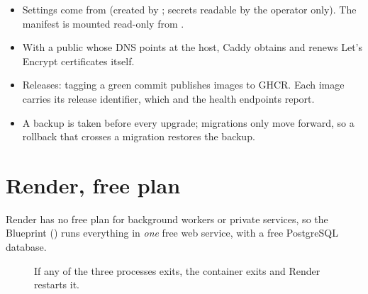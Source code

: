 \begin{itemize}
  \item Settings come from  (created by ; secrets readable by the operator only). The manifest is mounted read-only from .
  \item With a public  whose DNS points at the host, Caddy obtains and renews Let's Encrypt certificates itself.
  \item Releases: tagging a green commit  publishes  images to GHCR. Each image carries its release identifier, which  and the health endpoints report.
  \item A backup is taken before every upgrade; migrations only move forward, so a rollback that crosses a migration restores the backup.
\end{itemize}

\section{Render, free plan}

Render has no free plan for background workers or private services, so the Blueprint () runs everything in \emph{one} free web service, with a free PostgreSQL database.

\begin{figure}[htbp]
\centering
{}
\caption{If any of the three processes exits, the container exits and Render restarts it.}
\end{figure}


